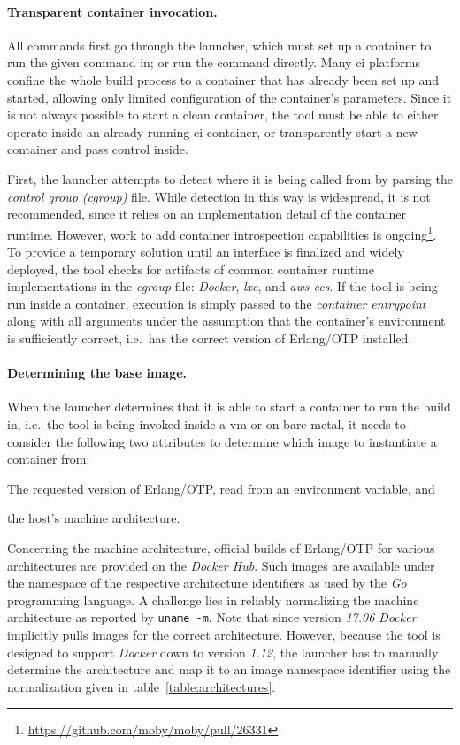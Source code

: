 \paragraph{Transparent container invocation.} All commands first go through the launcher, which must set up a container to run the given command in; or run the command directly. Many \acrshort{ci} platforms confine the whole build process to a container that has already been set up and started, allowing only limited configuration of the container's parameters. Since it is not always possible to start a clean container, the tool must be able to either operate inside an already-running \acrshort{ci} container, or transparently start a new container and pass control inside.

First, the launcher  attempts to detect where it is being called from by parsing the \emph{control group (cgroup)} file. While detection in this way is widespread, it is not recommended, since it relies on an implementation detail of the container runtime. However, work to add container introspection capabilities is ongoing\footnote{\url{https://github.com/moby/moby/pull/26331}}. To provide a temporary solution until an interface is finalized and widely deployed, the tool checks for artifacts of common container runtime implementations in the \emph{cgroup} file: \emph{Docker}, \emph{\acrfull{lxc}}, and \emph{\acrfull{aws} \acrfull{ecs}}. If the tool is being run inside a container, execution is simply passed to the \emph{container entrypoint} along with all arguments under the assumption that the container's environment is sufficiently correct, i.e.~has the correct version of Erlang/OTP installed.

\paragraph{Determining the base image.} When the launcher determines that it is able to start a container to run the build in, i.e.~the tool is being invoked inside a \acrshort{vm} or on bare metal, it needs to consider the following two attributes to determine which image to instantiate a container from:
\begin{enumerate*}[label=(\roman*)]
  \item The requested version of Erlang/OTP, read from an environment variable, and
  \item the host's machine architecture.
\end{enumerate*}

Concerning the machine architecture, official builds of Erlang/OTP for various architectures are provided on the \emph{Docker Hub}. Such images are available under the namespace of the respective architecture identifiers as used by the \emph{Go} programming language. A challenge lies in reliably normalizing the machine architecture as reported by \lstinline|uname -m|. Note that since version \emph{17.06 Docker} implicitly pulls images for the correct architecture. However, because the tool is designed to support \emph{Docker} down to version \emph{1.12}, the launcher has to manually determine the architecture and map it to an image namespace identifier using the normalization given in table~\ref{table:architectures}.

